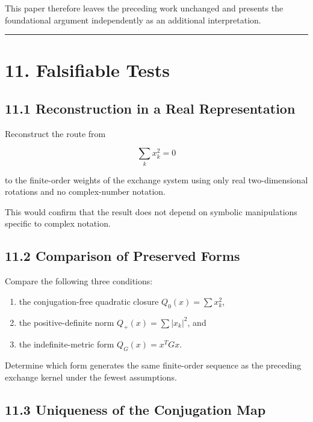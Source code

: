 \documentclass[
  a4paper,
  10pt]{article}
\providecommand{\tightlist}{%
  \setlength{\itemsep}{0pt}\setlength{\parskip}{0pt}}
\begin{document}
This paper therefore leaves the preceding work unchanged and presents
the foundational argument independently as an additional interpretation.

\begin{center}\rule{0.5\linewidth}{0.5pt}\end{center}

\section{11. Falsifiable Tests}\label{11-falsifiable-tests}

\subsection{11.1 Reconstruction in a Real
Representation}\label{111-reconstruction-in-a-real-representation}

Reconstruct the route from

\[
\sum_kx_k^2=0
\]

to the finite-order weights of the exchange system using only real
two-dimensional rotations and no complex-number notation.

This would confirm that the result does not depend on symbolic
manipulations specific to complex notation.

\subsection{11.2 Comparison of Preserved
Forms}\label{112-comparison-of-preserved-forms}

Compare the following three conditions:

\begin{enumerate}
\def\labelenumi{\arabic{enumi}.}
\tightlist
\item
  the conjugation-free quadratic closure \(Q_0(x)=\sum x_k^2\),
\item
  the positive-definite norm \(Q_+(x)=\sum|x_k|^2\), and
\item
  the indefinite-metric form \(Q_G(x)=x^TGx\).
\end{enumerate}

Determine which form generates the same finite-order sequence as the
preceding exchange kernel under the fewest assumptions.

\subsection{11.3 Uniqueness of the Conjugation
Map}\label{113-uniqueness-of-the-conjugation-map}
\end{document}

